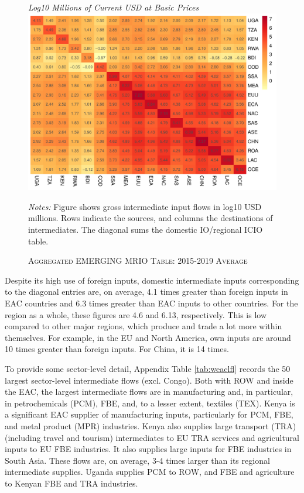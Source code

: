 \documentclass[a4paper]{article}
\begin{document}
\begin{figure}[h!] 
\centering
\caption{\label{fig:wld}\textsc{Aggregated EMERGING MRIO Table: 2015-2019 Average}}
\small{\textit{Log10 Millions of Current USD at Basic Prices}}
\includegraphics[width=1\textwidth, trim= {0 0 0 0}, clip]{"EM_heatmap_2015_19_AG.pdf"} \\ 
\raggedright
\scriptsize
\emph{Notes:} Figure shows gross intermediate input flows in log10 USD millions. Rows indicate the sources, and columns the destinations of intermediates. The diagonal sums the domestic IO/regional ICIO table. 
\end{figure}
\FloatBarrier

Despite its high use of foreign inputs, domestic intermediate inputs corresponding to the diagonal entries are, on average, 4.1 times greater than foreign inputs in EAC countries and 6.3 times greater than EAC inputs to other countries. For the region as a whole, these figures are 4.6 and 6.13, respectively. This is low compared to other major regions, which produce and trade a lot more within themselves. For example, in the EU and North America, own inputs are around 10 times greater than foreign inputs. For China, it is 14 times. \newline

To provide some sector-level detail, Appendix Table \ref{tab:weaclfl} records the 50 largest sector-level intermediate flows (excl. Congo). Both with ROW and inside the EAC, the largest intermediate flows are in manufacturing and, in particular, in petrochemicals (PCM), FBE, and, to a lesser extent, textiles (TEX). Kenya is a significant EAC supplier of manufacturing inputs, particularly for PCM, FBE, and metal product (MPR) industries. Kenya also supplies large transport (TRA) (including travel and tourism) intermediates to EU TRA services and agricultural inputs to EU FBE industries. It also supplies large inputs for FBE industries in South Asia. These flows are, on average, 3-4 times larger than its regional intermediate supplies. Uganda supplies PCM to ROW, and FBE and agriculture to Kenyan FBE and TRA industries. 
\end{document}
